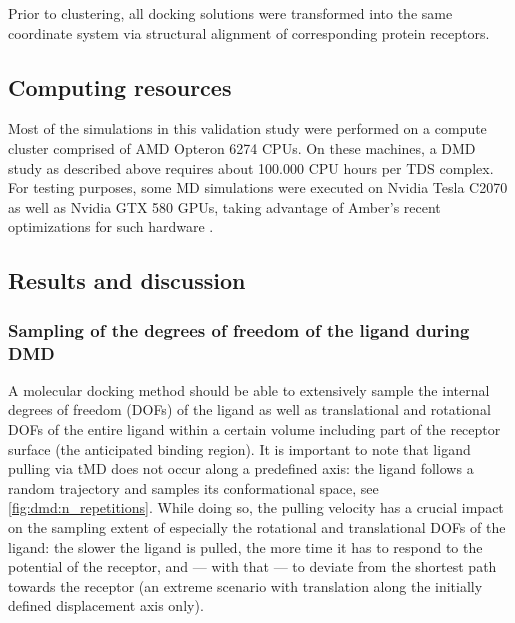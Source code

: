 
Prior to clustering, all docking solutions were transformed into the same
coordinate system via structural alignment of corresponding protein receptors.

\subsection{Computing resources}

Most of the simulations in this validation study were performed on a compute
cluster comprised of AMD Opteron 6274 CPUs. On these machines, a DMD study as
described above requires about 100.000 CPU hours per TDS complex. For testing
purposes, some MD simulations were executed on Nvidia Tesla C2070 as well as
Nvidia GTX 580 GPUs, taking advantage of Amber's recent optimizations for such
hardware \cite{amber_gpu_2012}.


\subsection{Results and discussion}
\label{dmd:results}

\subsubsection{Sampling of the degrees of freedom of the ligand during DMD}

A molecular docking method should be able to extensively sample the internal
degrees of freedom (DOFs) of the ligand as well as translational and rotational
DOFs of the entire ligand within a certain volume including part of the receptor
surface (the anticipated binding region). It is important to note that ligand
pulling via tMD does not occur along a predefined axis: the ligand follows a
random trajectory and samples its conformational space, see
\cref{fig:dmd:n_repetitions}. While doing so, the pulling velocity has a crucial
impact on the sampling extent of especially the rotational and translational
DOFs of the ligand: the slower the ligand is pulled, the more time it has to
respond to the potential of the receptor, and --- with that --- to deviate from
the shortest path towards the receptor (an extreme scenario with translation
along the initially defined displacement axis only).

